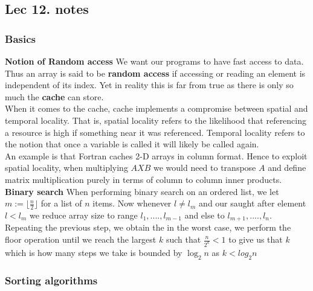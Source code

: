 \documentclass[titlepage]{article}
\theoremstyle{definition}
\newcommand{\floor}[1]{\lfloor #1 \rfloor}
\numberwithin{equation}{subsection}
\numberwithin{remark}{subsection}
\begin{document}
\subsection{Lec 12. notes}

\subsubsection{Basics}
\textbf{Notion of Random access} We want our programs to have fast access to data. Thus an array is said to be \textbf{random access} if accessing or reading an element is independent of its index. Yet in reality this is far from true as there is only so much the \textbf{cache} can store. 
\\
When it comes to the cache, cache implements a compromise between spatial and temporal locality. That is, spatial locality refers to the likelihood that referencing a resource is high if something near it was referenced. Temporal locality refers to the notion that once a variable is called it will likely be called again. 
\\
An example is that Fortran caches 2-D arrays in column format. Hence to exploit spatial locality, when multiplying $A X B$ we would need to transpose $A$ and define matrix multiplication purely in terms of column to column inner products. 
\clearpage
\textbf{Binary search} When performing binary search on an ordered list, we let $m := \floor{\frac{n}{2}}$ for a list of $n$ items. Now whenever $l \not = l_{m}$ and our saught after element $l < l_{m}$ we reduce array size to range $l_{1}, .... , l_{m-1}$ and else to $l_{m+1}, .... , l_{n}$. Repeating the previous step, we obtain the in the worst case, we perform the floor operation until we reach the largest $k$ such that $\frac{n}{2^{k}} < 1$ to give us that $k$ which is how many steps we take is bounded by $\log_{2}n$ as $k < log_{2}n$
\subsubsection{Sorting algorithms}
\end{document}
